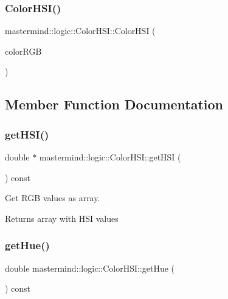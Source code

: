 \subsubsection{\texorpdfstring{Color\+H\+S\+I()}{ColorHSI()}\hspace{0.1cm}{\footnotesize\ttfamily [2/2]}}
{\footnotesize\ttfamily mastermind\+::logic\+::\+Color\+H\+S\+I\+::\+Color\+H\+SI (\begin{DoxyParamCaption}\item[{const \hyperlink{classmastermind_1_1logic_1_1_color_r_g_b}{Color\+R\+GB} \&}]{color\+R\+GB }\end{DoxyParamCaption})}



\subsection{Member Function Documentation}
\hypertarget{classmastermind_1_1logic_1_1_color_h_s_i_aebf66c900b34e386b8ae72587f418ce9}{}\label{classmastermind_1_1logic_1_1_color_h_s_i_aebf66c900b34e386b8ae72587f418ce9} 
\subsubsection{\texorpdfstring{get\+H\+S\+I()}{getHSI()}}
{\footnotesize\ttfamily double $\ast$ mastermind\+::logic\+::\+Color\+H\+S\+I\+::get\+H\+SI (\begin{DoxyParamCaption}{ }\end{DoxyParamCaption}) const}



Get R\+GB values as array. 

\begin{DoxyReturn}{Returns}
array with H\+SI values 
\end{DoxyReturn}
\hypertarget{classmastermind_1_1logic_1_1_color_h_s_i_ae22e195f505ccf77516944c3ea3062c9}{}\label{classmastermind_1_1logic_1_1_color_h_s_i_ae22e195f505ccf77516944c3ea3062c9} 
\subsubsection{\texorpdfstring{get\+Hue()}{getHue()}}
{\footnotesize\ttfamily double mastermind\+::logic\+::\+Color\+H\+S\+I\+::get\+Hue (\begin{DoxyParamCaption}{ }\end{DoxyParamCaption}) const}



